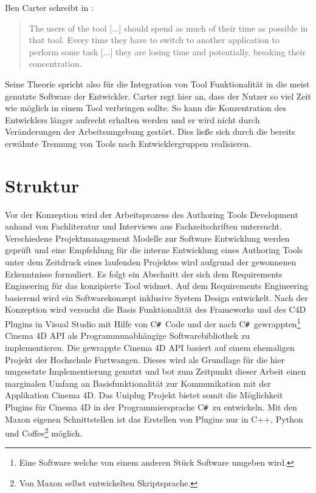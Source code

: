 \documentclass[pagesize, paper=a4, fontsize=12pt, titlepage=true, headings=small, headnosepline, abstractoff, liststotoc, nochapterprefix, plainheadsepline, twoside]{scrreprt}
\newcommand{\CSS}{C\texttt{\# }}
\begin{document}
Ben Carter schreibt in :
\begin{quote}
\glqq The users of the tool [...] should spend as much of their time as possible in that tool. Every time they have to switch to another application to perform some task [...] they are losing time and potentially, breaking their concentration. \grqq{} 
\end{quote}
Seine Theorie spricht also für die Integration von Tool Funktionalität in die meist genutzte Software der Entwickler. Carter regt hier an, dass der Nutzer so viel Zeit wie möglich in einem Tool verbringen sollte. So kann die Konzentration des Entwicklers länger aufrecht erhalten werden und er wird nicht durch Veränderungen der Arbeitsumgebung gestört. Dies ließe sich durch die bereits erwähnte Trennung von Tools nach Entwicklergruppen realisieren.

\section{Struktur}
Vor der Konzeption wird der Arbeitsprozess des Authoring Tools Development anhand von Fachliteratur und Interviews aus Fachzeitschriften untersucht. Verschiedene Projektmanagement Modelle zur Software Entwicklung werden geprüft und eine Empfehlung für die interne Entwicklung eines Authoring Tools unter dem Zeitdruck eines laufenden Projektes wird aufgrund der gewonnenen Erkenntnisse formuliert. Es folgt ein Abschnitt der sich dem Requirements Engineering für das konzipierte Tool widmet. Auf dem Requirements Engineering basierend wird ein Softwarekonzept inklusive System Design entwickelt. Nach der Konzeption wird versucht die Basis Funktionalität des Frameworks und des C4D Plugins in Visual Studio mit Hilfe von \CSS Code und der nach \CSS gewrappten\footnote{Eine Software welche von einem anderen Stück Software umgeben wird.} Cinema 4D API als Programmunabhängige Softwarebibliothek zu implementieren. Die gewrappte Cinema 4D API basiert auf einem ehemaligen Projekt der Hochschule Furtwangen. Dieses wird als Grundlage für die hier umgesetzte Implementierung genutzt und bot zum Zeitpunkt dieser Arbeit einen marginalen Umfang an Basisfunktionalität zur Kommunikation mit der Applikation Cinema 4D. Das Uniplug Projekt bietet somit die Möglichkeit Plugins für Cinema 4D in der Programmiersprache \CSS zu entwickeln. Mit den Maxon eigenen Schnittstellen ist das Erstellen von Plugins nur in C++, Python und Coffee\footnote{Von Maxon selbst entwickelten Skriptsprache.} möglich.
\end{document}
